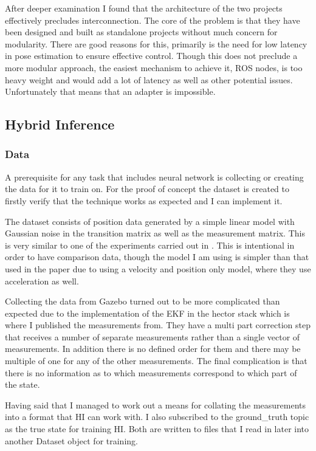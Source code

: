 \documentclass[]{../resources/final_report}
\begin{document}
After deeper examination I found that the architecture of the two projects effectively precludes interconnection.
The core of the problem is that they have been designed and built as standalone projects without much 
concern for modularity. There are good reasons for this, primarily is the need for low latency in pose 
estimation to ensure effective control. Though this does not preclude a more modular approach, the easiest
mechanism to achieve it, ROS nodes, is too heavy weight and would add a lot of latency as well as other 
potential issues. Unfortunately that means that an adapter is impossible.

\subsection{Hybrid Inference}

\subsubsection{Data}

A prerequisite for any task that includes neural network is collecting or creating the data for it 
to train on. For the proof of concept the dataset is created to firstly verify that the 
technique works as expected and I can implement it.

The dataset consists of position data generated by a simple linear model with Gaussian noise in the 
transition matrix as well as the measurement matrix. This is very similar to one of the experiments 
carried out in \cite{Satorras2019CombiningGA}. This is intentional in order to have comparison data,
though the model I am using is simpler than that used in the paper due to using a velocity and position
only model, where they use acceleration as well.

Collecting the data from Gazebo turned out to be more complicated than expected due to the implementation
of the EKF in the hector stack which is where I published the measurements from. They have a multi part correction step that receives a number of separate
measurements rather than a single vector of measurements. In addition there is no defined order for them and 
there may be multiple of one for any of the other measurements. The final complication is that there is 
no information as to which measurements correspond to which part of the state.

Having said that I managed to work out a means for collating the measurements into a format that HI can
work with. I also subscribed to the ground\_truth topic as the true state for training HI. Both are written
to files that I read in later into another Dataset object for training.
\end{document}
